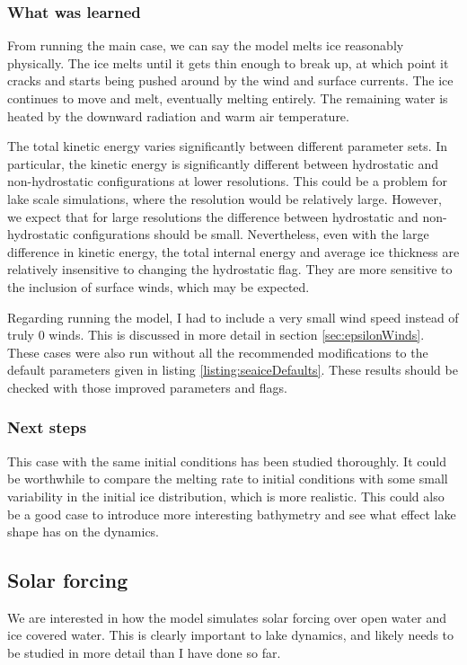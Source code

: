 \documentclass[11pt]{article}
\begin{document}
\subsubsection{What was learned}
From running the main case, we can say the model melts ice reasonably physically. The ice melts until it gets thin enough to break up, at which point it cracks and starts being pushed around by the wind and surface currents. The ice continues to move and melt, eventually melting entirely. The remaining water is heated by the downward radiation and warm air temperature.

The total kinetic energy varies significantly between different parameter sets. In particular, the kinetic energy is significantly different between hydrostatic and non-hydrostatic configurations at lower resolutions. This could be a problem for lake scale simulations, where the resolution would be relatively large. However, we expect that for large resolutions the difference between hydrostatic and non-hydrostatic configurations should be small. Nevertheless, even with the large difference in kinetic energy, the total internal energy and average ice thickness are relatively insensitive to changing the hydrostatic flag. They are more sensitive to the inclusion of surface winds, which may be expected.

Regarding running the model, I had to include a very small wind speed instead of truly 0 winds. This is discussed in more detail in section \ref{sec:epsilonWinds}. These cases were also run without all the recommended modifications to the default parameters given in listing \ref{listing:seaiceDefaults}. These results should be checked with those improved parameters and flags.

\subsubsection{Next steps}
This case with the same initial conditions has been studied thoroughly. It could be worthwhile to compare the melting rate to initial conditions with some small variability in the initial ice distribution, which is more realistic. This could also be a good case to introduce more interesting bathymetry and see what effect lake shape has on the dynamics.

\subsection{Solar forcing}
We are interested in how the model simulates solar forcing over open water and ice covered water. This is clearly important to lake dynamics, and likely needs to be studied in more detail than I have done so far.
\end{document}
